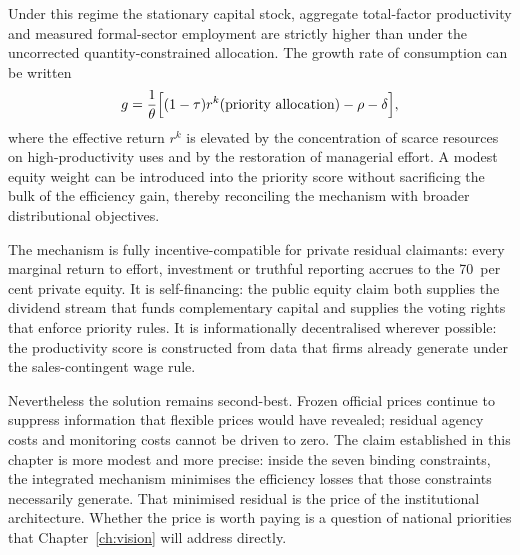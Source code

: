 \documentclass[12pt,anyside]{book}
\theoremstyle{definition}
\theoremstyle{plain}
\theoremstyle{remark}
\begin{document}
Under this regime the stationary capital stock, aggregate total-factor productivity and measured formal-sector employment are strictly higher than under the uncorrected quantity-constrained allocation. The growth rate of consumption can be written
\begin{equation}
g=\frac{1}{\theta}\Bigl[(1-\tau)r^k(\text{priority allocation})-\rho-\delta\Bigr],
\end{equation}
where the effective return $r^k$ is elevated by the concentration of scarce resources on high-productivity uses and by the restoration of managerial effort. A modest equity weight can be introduced into the priority score without sacrificing the bulk of the efficiency gain, thereby reconciling the mechanism with broader distributional objectives.

The mechanism is fully incentive-compatible for private residual claimants: every marginal return to effort, investment or truthful reporting accrues to the 70~per cent private equity. It is self-financing: the public equity claim both supplies the dividend stream that funds complementary capital and supplies the voting rights that enforce priority rules. It is informationally decentralised wherever possible: the productivity score is constructed from data that firms already generate under the sales-contingent wage rule.

Nevertheless the solution remains second-best. Frozen official prices continue to suppress information that flexible prices would have revealed; residual agency costs and monitoring costs cannot be driven to zero. The claim established in this chapter is more modest and more precise: inside the seven binding constraints, the integrated mechanism minimises the efficiency losses that those constraints necessarily generate. That minimised residual is the price of the institutional architecture. Whether the price is worth paying is a question of national priorities that Chapter~\ref{ch:vision} will address directly.

\end{document}
